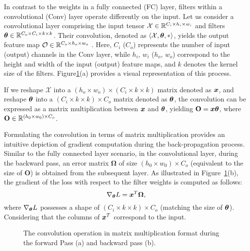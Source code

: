 \documentclass{article}
\begin{document}
In contrast to the weights in a fully connected (FC) layer, filters within a convolutional (Conv) layer operate differently on the input. Let us consider a convolutional layer comprising the input tensor $\mathcal{X} \in \mathbb{R}^{C_i \times h_i \times w_i}$ and filters ${\bm{\theta}} \in \mathbb{R}^{C_o \times C_i \times k \times k}$. Their convolution, denoted as $\langle \mathcal{X},{\bm{\theta}},*\rangle$, yields the output feature map $\mathcal{O} \in \mathbb{R}^{C_o \times h_o \times w_o}$ \citep{conv_op}. Here, $C_i$ ($C_o$) represents the number of input (output) channels in the Conv layer, while $h_i$, $w_i$ ($h_o$, $w_o$) correspond to the height and width of the input (output) feature maps, and $k$ denotes the kernel size of the filters. Figure\ref{fig:conv-layer}(a) provides a visual representation of this process.

If we reshape $\mathcal{X}$ into a $(h_o \times w_o) \times (C_i\times k \times k)$ matrix denoted as ${\bm{x}}$, and reshape ${\bm{\theta}}$ into a $(C_i\times k \times k) \times C_o$ matrix denoted as ${\bm{\theta}}$, the convolution can be expressed as a matrix multiplication between ${\bm{x}}$ and ${\bm{\theta}}$, yielding $\mathbf{O}={\bm{x}}{\bm{\theta}}$, where $\mathbf{O} \in \mathbb{R}^{(h_0\times w_0)\times C_o}$. 

Formulating the convolution in terms of matrix multiplication provides an intuitive depiction of gradient computation during the back-propagation process. Similar to the fully connected layer scenario, in the convolutional layer, during the backward pass, an error matrix $\bm{\Omega}$ of size $(h_0\times w_0)\times C_o$ (equivalent to the size of $\mathbf{O}$) is obtained from the subsequent layer. As illustrated in Figure~\ref{fig:conv-layer}(b), the gradient of the loss with respect to the filter weights is computed as follows:
\begin{equation}
\nabla_{{\bm{\theta}}} L = {\bm{x}}^T \bm{\Omega},
\end{equation}
where $\nabla_{{\bm{\theta}}}L$ possesses a shape of $(C_i\times k \times k) \times C_o$ (matching the size of ${\bm{\theta}}$). Considering that the columns of ${\bm{x}}^T$ correspond to the input.
\begin{figure}[H]%
    \centering
    \qquad
    \caption{The convolution operation in matrix multiplication format during the forward Pass (a) and backward pass (b).}
    \label{fig:conv-layer}
\end{figure}
\end{document}
